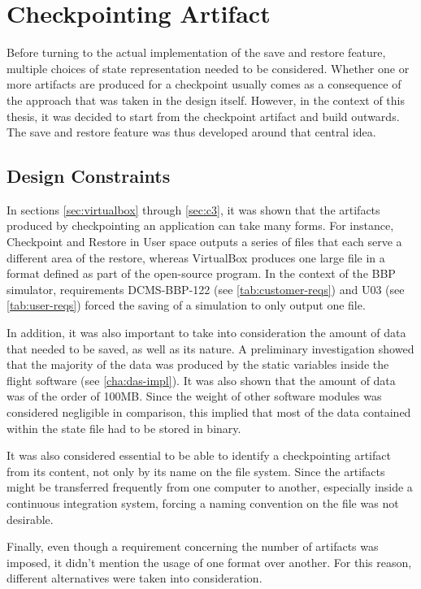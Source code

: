 {
\setlength{\parindent}{2em}
\chapter{Checkpointing Artifact} \label{cha:prod-artifact}
Before turning to the actual implementation of the save and restore feature, multiple choices of state representation needed to be considered. Whether one or more artifacts are produced for a checkpoint usually comes as a consequence of the approach that was taken in the design itself. However, in the context of this thesis, it was decided to start from the checkpoint artifact and build outwards. The save and restore feature was thus developed around that central idea.

\section{Design Constraints}\label{sec:file-constraints}
In sections \ref{sec:virtualbox} through \ref{sec:c3}, it was shown that the artifacts produced by checkpointing an application can take many forms. For instance, Checkpoint and Restore in User space outputs a series of files that each serve a different area of the restore, whereas VirtualBox produces one large file in a format defined as part of the open-source program. In the context of the BBP simulator, requirements DCMS-BBP-122 (see \autoref{tab:customer-reqs}) and U03 (see \autoref{tab:user-reqs}) forced the saving of a simulation to only output one file.

In addition, it was also important to take into consideration the amount of data that needed to be saved, as well as its nature. A preliminary investigation showed that the majority of the data was produced by the static variables inside the flight software (see \autoref{cha:das-impl}). It was also shown that the amount of data was of the order of 100MB. Since the weight of other software modules was considered negligible in comparison, this implied that most of the data contained within the state file had to be stored in binary.

It was also considered essential to be able to identify a checkpointing artifact from its content, not only by its name on the file system. Since the artifacts might be transferred frequently from one computer to another, especially inside a continuous integration system, forcing a naming convention on the file was not desirable.

Finally, even though a requirement concerning the number of artifacts was imposed, it didn't mention the usage of one format over another. For this reason, different alternatives were taken into consideration. 

}
